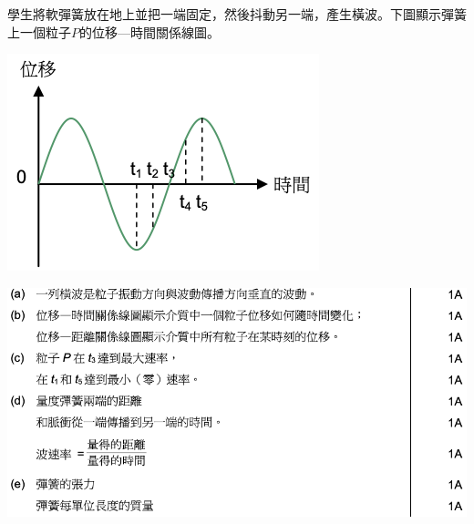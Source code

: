 {
    學生將軟彈簧放在地上並把一端固定，然後抖動另一端，產生橫波。下圖顯示彈簧上一個粒子$P$的位移—時間關係線圖。
    \par{\par\centering\includegraphics[width=.4\textwidth]{./img/ch1_earlyclass_wave_lq_2024-05-13-13-08-15.png}\par}
    \clearpage{}
}{
    \sol\par{\par\centering\includegraphics[width=\textwidth]{./img/ch1_earlyclass_wave_lq_2024-05-13-13-10-00.png}\par}
}

